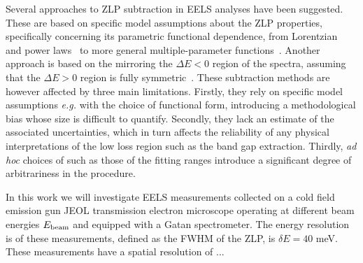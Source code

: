 Several approaches to ZLP subtraction in EELS analyses have been suggested.
%
These are based on specific model assumptions about the ZLP properties, specifically
concerning its parametric functional dependence, from Lorentzian~\cite{Dorneich:1998}
and power laws~\cite{Erni:2005} to more general multiple-parameter functions~\cite{Benthem:2001}.
%
Another approach is based on the mirroring the $\Delta E <0$ region of the spectra, assuming
that the $\Delta E>0$ region is fully symmetric~\cite{Lazar:2003}.
%
These  subtraction methods are however affected by three main limitations.
%
Firstly, they rely on specific model assumptions {\it e.g.} with
the choice of functional form, introducing a methodological
bias whose size is difficult to quantify.
%
Secondly, they lack an estimate of the associated uncertainties, which in turn affects
the reliability of any physical interpretations of the low loss region such as the band gap extraction.
%
Thirdly, {\it ad hoc} choices of such as those of the fitting ranges introduce a significant degree of
arbitrariness in the procedure.
      
In this work we will investigate EELS measurements collected  on a cold field emission gun JEOL
transmission electron microscope operating at different beam energies $E_{\rm beam}$
and equipped with a  Gatan spectrometer.
%
The energy resolution is of these measurements,
defined as the FWHM of the ZLP, is $\delta E=40$ meV.
%
These measurements have a spatial resolution of ...

